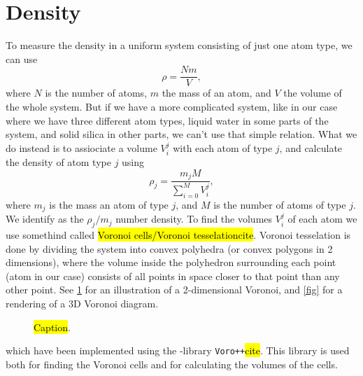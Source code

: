 \section{Density}
To measure the density in a uniform system consisting of just one atom type, we can use
\[
    \rho = \frac{Nm}{V},
\]
where $N$ is the number of atoms, $m$ the mass of an atom, and $V$ the volume of the whole system. But if we have a more complicated system, like in our case where we have three different atom types, liquid water in some parts of the system, and solid silica in other parts, we can't use that simple relation. What we do instead is to assiociate a volume $V_i^j$ with each atom of type $j$, and calculate the density of atom type $j$ using
\[
    \rho_j = \dfrac{m_jM}{\sum_{i=0}^M V_i^j},
\]
where $m_j$ is the mass an atom of type $j$, and $M$ is the number of atoms of type $j$. We identify as the $\rho_j/m_j$ number density. To find the volumes $V_i^j$ of each atom we use somethind called \hl{Voronoi cells/Voronoi tesselation}\hl{cite}. Voronoi tesselation is done by dividing the system into convex polyhedra (or convex polygons in 2 dimensions), where the volume inside the polyhedron surrounding each point (atom in our case) consists of all points in space closer to that point than any other point. See \cref{fig:2d_voronoi_diagram} for an illustration of a 2-dimensional Voronoi, and \cref{fig} for a rendering of a 3D Voronoi diagram.
%
\begin{figure}[htpb]%
\centering%
%
\caption{%
    \hl{Caption}. %
    \label{fig:2d_voronoi_diagram}%
}%
\end{figure}%
which have been implemented using the \cpp-library \Verb!Voro++!\hl{cite}. This library is used both for finding the Voronoi cells and for calculating the volumes of the cells.
%
